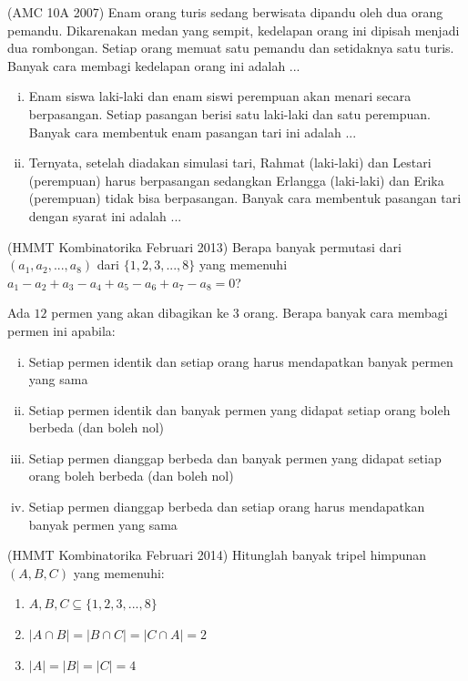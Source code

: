 \documentclass[11pt]{scrartcl}
\begin{document}
\begin{problem}
    (AMC 10A 2007) Enam orang turis sedang berwisata dipandu oleh dua orang pemandu. Dikarenakan medan yang sempit, kedelapan orang ini dipisah menjadi dua rombongan. Setiap orang memuat satu pemandu dan setidaknya satu turis. Banyak cara membagi kedelapan orang ini adalah ...
\end{problem}

\begin{problem}
    \begin{enumerate}[i.]
        \item Enam siswa laki-laki dan enam siswi perempuan akan menari secara berpasangan. Setiap pasangan berisi satu laki-laki dan satu perempuan. Banyak cara membentuk enam pasangan tari ini adalah ...
        \item Ternyata, setelah diadakan simulasi tari, Rahmat (laki-laki) dan Lestari (perempuan) harus berpasangan sedangkan Erlangga (laki-laki) dan Erika (perempuan) tidak bisa berpasangan. Banyak cara membentuk pasangan tari dengan syarat ini adalah ...
    \end{enumerate}
\end{problem}

\begin{problem}
    (HMMT Kombinatorika Februari 2013) Berapa banyak permutasi dari $(a_1, a_2,..., a_8)$ dari $\{1, 2, 3,..., 8\}$ yang memenuhi $a_1 - a_2 + a_3 - a_4 + a_5 - a_6 + a_7 - a_8 = 0$?
\end{problem}

\begin{problem}
    Ada $12$ permen yang akan dibagikan ke $3$ orang. Berapa banyak cara membagi permen ini apabila:
    \begin{enumerate}[i.]
        \item Setiap permen identik dan setiap orang harus mendapatkan banyak permen yang sama
        \item Setiap permen identik dan banyak permen yang didapat setiap orang boleh berbeda (dan boleh nol)
        \item Setiap permen dianggap berbeda dan banyak permen yang didapat setiap orang boleh berbeda (dan boleh nol)
        \item Setiap permen dianggap berbeda dan setiap orang harus mendapatkan banyak permen yang sama
    \end{enumerate}
\end{problem}

\begin{problem}
    (HMMT Kombinatorika Februari 2014) Hitunglah banyak tripel himpunan $(A, B, C)$ yang memenuhi:
    \begin{enumerate}
        \item $A, B, C \subseteq \{1, 2, 3, ..., 8\}$ 
        \item $|A \cap B| = |B \cap C| = |C \cap A| = 2$
        \item $|A| = |B| = |C| = 4$
    \end{enumerate}
\end{problem}
\end{document}
